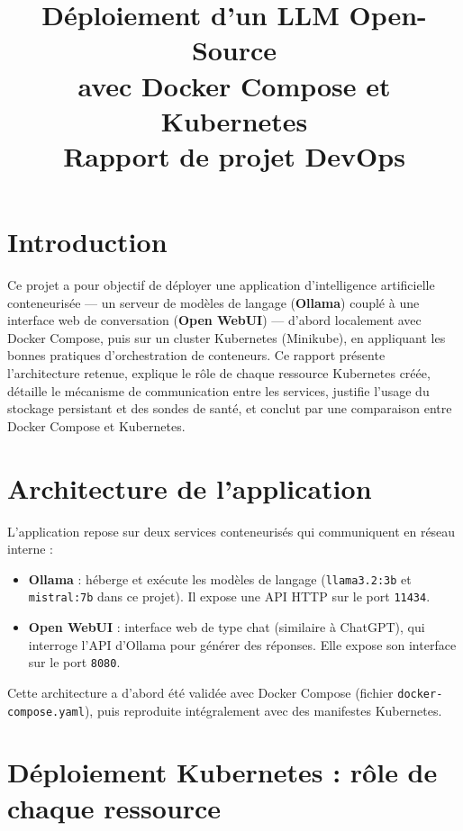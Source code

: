 ﻿\documentclass[11pt,a4paper]{article}
\title{\vspace{-1.5cm}\textbf{Déploiement d'un LLM Open-Source \\ avec Docker Compose et Kubernetes}\\[0.3cm]
\large Rapport de projet DevOps}
\author{}
\date{}
\begin{document}
\maketitle
\thispagestyle{fancy}
\vspace{-1.2cm}

\section*{Introduction}

Ce projet a pour objectif de déployer une application d'intelligence artificielle conteneurisée --- un serveur de modèles de langage (\textbf{Ollama}) couplé à une interface web de conversation (\textbf{Open WebUI}) --- d'abord localement avec Docker Compose, puis sur un cluster Kubernetes (Minikube), en appliquant les bonnes pratiques d'orchestration de conteneurs. Ce rapport présente l'architecture retenue, explique le rôle de chaque ressource Kubernetes créée, détaille le mécanisme de communication entre les services, justifie l'usage du stockage persistant et des sondes de santé, et conclut par une comparaison entre Docker Compose et Kubernetes.

\section{Architecture de l'application}

L'application repose sur deux services conteneurisés qui communiquent en réseau interne :

\begin{itemize}[nosep]
    \item \textbf{Ollama} : héberge et exécute les modèles de langage (\texttt{llama3.2:3b} et \texttt{mistral:7b} dans ce projet). Il expose une API HTTP sur le port \texttt{11434}.
    \item \textbf{Open WebUI} : interface web de type chat (similaire à ChatGPT), qui interroge l'API d'Ollama pour générer des réponses. Elle expose son interface sur le port \texttt{8080}.
\end{itemize}

Cette architecture a d'abord été validée avec Docker Compose (fichier \texttt{docker-compose.yaml}), puis reproduite intégralement avec des manifestes Kubernetes.

\section{Déploiement Kubernetes : rôle de chaque ressource}
\end{document}
